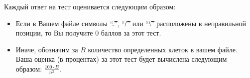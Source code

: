 Каждый ответ на тест оценивается следующим образом:
\begin{itemize}
\item Если в Вашем файле символы ``\t{.}'', ``\t{/}'' или ``\t{\textbackslash}'' расположены в неправильной позиции, то Вы получите 0 баллов за этот тест.
\item Иначе, обозначим за $B$ количество определенных клеток в вашем файле. Ваша оценка (в процентах) за этот тест будет вычислена следующим образом:
$\frac{100 \cdot B}{n^2}$.
\end{itemize}

